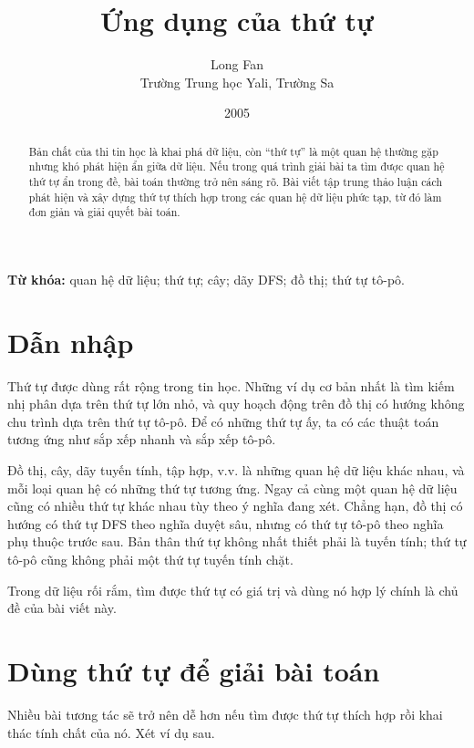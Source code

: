 \documentclass[11pt]{article}
\title{Ứng dụng của thứ tự}
\author{Long Fan\\Trường Trung học Yali, Trường Sa}
\date{2005}
\begin{document}
\maketitle


\renewcommand{\abstractname}{Tóm tắt}
\begin{abstract}
Bản chất của thi tin học là khai phá dữ liệu, còn ``thứ tự'' là một quan hệ
thường gặp nhưng khó phát hiện ẩn giữa dữ liệu. Nếu trong quá trình giải bài
ta tìm được quan hệ thứ tự ẩn trong đề, bài toán thường trở nên sáng rõ. Bài
viết tập trung thảo luận cách phát hiện và xây dựng thứ tự thích hợp trong các
quan hệ dữ liệu phức tạp, từ đó làm đơn giản và giải quyết bài toán.
\end{abstract}

\noindent\textbf{Từ khóa:} quan hệ dữ liệu; thứ tự; cây; dãy DFS; đồ thị; thứ
tự tô-pô.

\section{Dẫn nhập}

Thứ tự được dùng rất rộng trong tin học. Những ví dụ cơ bản nhất là tìm kiếm
nhị phân dựa trên thứ tự lớn nhỏ, và quy hoạch động trên đồ thị có hướng không
chu trình dựa trên thứ tự tô-pô. Để có những thứ tự ấy, ta có các thuật toán
tương ứng như sắp xếp nhanh và sắp xếp tô-pô.

Đồ thị, cây, dãy tuyến tính, tập hợp, v.v. là những quan hệ dữ liệu khác nhau,
và mỗi loại quan hệ có những thứ tự tương ứng. Ngay cả cùng một quan hệ dữ
liệu cũng có nhiều thứ tự khác nhau tùy theo ý nghĩa đang xét. Chẳng hạn, đồ
thị có hướng có thứ tự DFS theo nghĩa duyệt sâu, nhưng có thứ tự tô-pô theo
nghĩa phụ thuộc trước sau. Bản thân thứ tự không nhất thiết phải là tuyến
tính; thứ tự tô-pô cũng không phải một thứ tự tuyến tính chặt.

Trong dữ liệu rối rắm, tìm được thứ tự có giá trị và dùng nó hợp lý chính là
chủ đề của bài viết này.

\section{Dùng thứ tự để giải bài toán}

Nhiều bài tương tác sẽ trở nên dễ hơn nếu tìm được thứ tự thích hợp rồi khai
thác tính chất của nó. Xét ví dụ sau.
\end{document}
